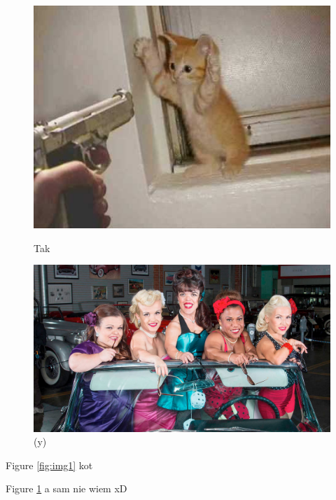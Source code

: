 \documentclass[11pt]{article}
\begin{document}
\begin{center}
\begin{figure}[!tbp]
  \centering
  \begin{minipage}[b]{0.4\textwidth}
    \includegraphics[width=\textwidth]{img1}
    \caption{Tak}
    \label{fig:img1}
  \end{minipage}
  \hfill
  \begin{minipage}[b]{0.4\textwidth}
    \includegraphics[width=\textwidth]{img2}
    \caption{(y)}
    \label{fig:img2}
  \end{minipage}
\end{figure}
Figure \ref{fig:img1} kot

Figure \ref{fig:img2} a sam nie wiem xD
\end{center}
 \newpage
\end{document}
